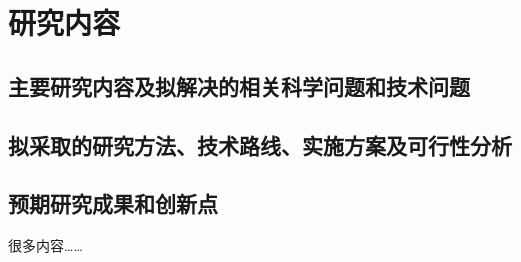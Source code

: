 



\section{研究内容}
\begin{mdframed}[everyline=true]
	
\subsection{主要研究内容及拟解决的相关科学问题和技术问题}
	
\subsection{拟采取的研究方法、技术路线、实施方案及可行性分析}

\subsection{预期研究成果和创新点}

很多内容……
\\[10 cm]
\end{mdframed}


